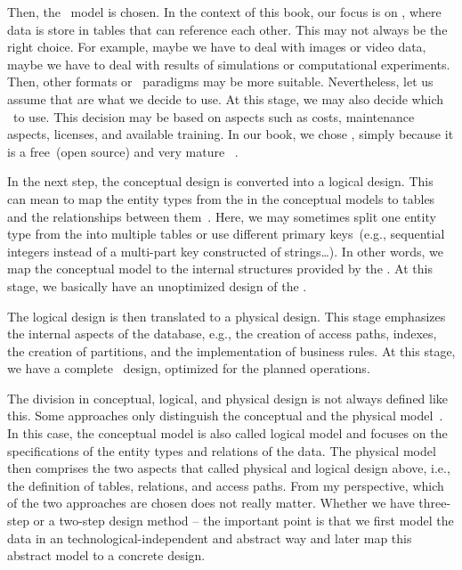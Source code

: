 Then, the \db\ model is chosen.
In the context of this book, our focus is on , where data is store in tables that can reference each other.
This may not always be the right choice.
For example, maybe we have to deal with images or video data, maybe we have to deal with results of simulations or computational experiments.
Then, other formats or \db\ paradigms may be more suitable.
Nevertheless, let us assume that  are what we decide to use.
At this stage, we may also decide which \dbms\ to use.
This decision may be based on aspects such as costs, maintenance aspects, licenses, and available training.
In our book, we chose \postgresql, simply because it is a free~(open source) and very mature \sql\ \dbms.

In the next step, the conceptual design is converted into a logical design.
This can mean to map the entity types from the  in the conceptual models to tables and the relationships between them~\cite{SS2005EIDDDFDB:I,SS2005EIDDDFDB:CDDRAAML}.
Here, we may sometimes split one entity type from the  into multiple tables or use different primary keys~(e.g., sequential integers instead of a multi-part key constructed of strings\dots).
In other words, we map the conceptual model to the internal structures provided by the \dbms.
At this stage, we basically have an unoptimized design of the \db.

The logical design is then translated to a physical design.
This stage emphasizes the internal aspects of the database, e.g., the creation of access paths, indexes, the creation of partitions, and the implementation of business rules.
At this stage, we have a complete \db\ design, optimized for the planned operations.

The division in conceptual, logical, and physical design is not always defined like this.
Some approaches only distinguish the conceptual and the physical model~\cite{G2011EW2ITDS:ITRD,V1999C5DMS:CI}.
In this case, the conceptual model is also called logical model and focuses on the specifications of the entity types and relations of the data.
The physical model then comprises the two aspects that called physical and logical design above, i.e., the definition of tables, relations, and access paths.
From my perspective, which of the two approaches are chosen does not really matter.
Whether we have three-step or a two-step design method -- the important point is that we first model the data in an technological-independent and abstract way and later map this abstract model to a concrete design.

